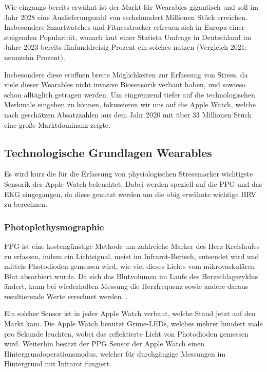 Wie eingangs bereits erwähnt ist der Markt für Wearables gigantisch und soll im Jahr 2028 eine Auslieferungszahl von sechshundert Millionen Stück erreichen. Insbesondere Smartwatches und 
Fitnesstracker erfreuen sich in Europa einer steigenden Popularität, wonach laut einer Statista Umfrage in Deutschland im Jahre 2023 bereits fünfunddreisig Prozent ein solches nutzen (Vergleich 2021: neunzehn Prozent). \cite{bocksch2023nutzung}

Insbesondere diese eröffnen breite Möglichkeiten zur Erfassung von Stress, da viele dieser Wearables nicht invasive Biosensorik verbaut haben, und sowieso schon alltäglich getragen werden. Um eingrenzend tiefer auf die technologischen Merkmale eingehen 
zu können, fokussieren wir uns auf die Apple Watch, welche nach geschätzen Absatzzahlen aus dem Jahr 2020 mit über 33 Millionen Stück eine große Marktdominanz zeigte. \cite{bocksch2021apple}



\subsection{Technologische Grundlagen Wearables}

Es wird kurz die für die Erfassung von physiologischen Stressmarker wichtigste Sensorik der Apple Watch beleuchtet. Dabei werden speziell auf die \ac{PPG} und das \ac{EKG} eingegangen, da diese genutzt werden um die obig erwähnte wichtige \ac{HRV} zu berechnen.

\subsubsection{Photoplethysmographie}
\ac{PPG} ist eine kostengünstige Methode um zahlreiche Marker des Herz-Kreislaufes zu erfassen, indem ein Lichtsignal, meist im Infrarot-Beriech, entsendet wird und mittels Photodioden gemessen wird, 
wie viel dieses Lichts vom mikrovaskulären Blut absorbiert wurde. Da sich das Blutvolumen im Laufe des Herzschlagszyklus ändert, 
kann bei wiederholten Messung die Herzfrequenz sowie andere daraus resultierende Werte errechnet werden. \cite{Allen2007}. 

Ein solcher Sensor ist in jeder Apple Watch verbaut, welche Stand jetzt auf den Markt kam. Die Apple Watch benutzt Grüne-LEDs, welches mehrer hundert male pro Sekunde leuchten, wobei das reflektierte Licht 
von Photodioden gemessen wird. Weiterhin besitzt der \ac{PPG} Sensor der Apple Watch einen Hintergrundoperationsmodus, welcher für durchgängige Messungen im Hintergrund mit Infrarot fungiert.

